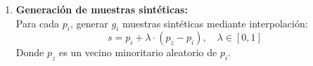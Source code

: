 \documentclass[12pt]{article}
\begin{document}
\begin{enumerate}[label=\textbf{\arabic*.}]
    \item \textbf{Generación de muestras sintéticas:}\\
    Para cada \( p_i \), generar \( g_i \) muestras sintéticas mediante interpolación:
    \[
    s = p_i + \lambda \cdot (p_z - p_i), \quad \lambda \in [0, 1]
    \]
    Donde \( p_z \) es un vecino minoritario aleatorio de \( p_i \).
\end{enumerate}
\end{document}
